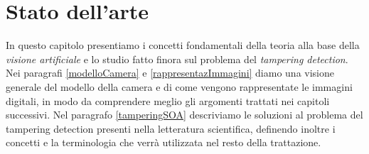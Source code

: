 \chapter{Stato dell'arte}
\label{StatoArte}
\thispagestyle{empty}

\vspace{0.5cm}

\noindent In questo capitolo presentiamo i concetti fondamentali della teoria alla base della \textit{visione artificiale} e lo studio fatto finora sul problema del \textit{tampering detection}.
Nei paragrafi \ref{modelloCamera} e \ref{rappresentazImmagini} diamo una visione generale del modello della camera e di come vengono rappresentate le immagini digitali, in modo da comprendere meglio gli argomenti trattati nei capitoli successivi.
Nel paragrafo \ref{tamperingSOA} descriviamo le soluzioni al problema del tampering detection presenti nella letteratura scientifica, definendo inoltre i concetti e la terminologia che verr\`a utilizzata nel resto della trattazione.
